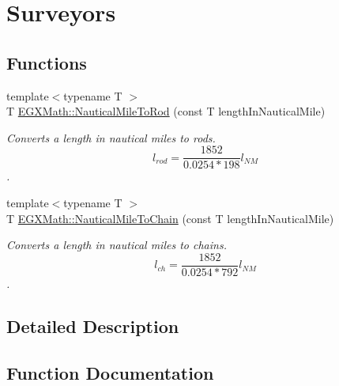 \hypertarget{group___e_g_x_math-_conversions-_length_conversions-_non-_s_i-_nautical_mile-_surveyors}{}\section{Surveyors}
\label{group___e_g_x_math-_conversions-_length_conversions-_non-_s_i-_nautical_mile-_surveyors}
\subsection*{Functions}
\begin{DoxyCompactItemize}
\item 
{\footnotesize template$<$typename T $>$ }\\T \mbox{\hyperlink{group___e_g_x_math-_conversions-_length_conversions-_non-_s_i-_nautical_mile-_surveyors_gafcc747668b6e7d9a786bd74dc9c95c50}{E\+G\+X\+Math\+::\+Nautical\+Mile\+To\+Rod}} (const T length\+In\+Nautical\+Mile)
\begin{DoxyCompactList}\small\item\em Converts a length in nautical miles to rods. \[ l_{rod}= \frac{1852}{0.0254 * 198} l_{NM} \]. \end{DoxyCompactList}\item 
{\footnotesize template$<$typename T $>$ }\\T \mbox{\hyperlink{group___e_g_x_math-_conversions-_length_conversions-_non-_s_i-_nautical_mile-_surveyors_ga22c96aeb0650b63698c2513a60f81456}{E\+G\+X\+Math\+::\+Nautical\+Mile\+To\+Chain}} (const T length\+In\+Nautical\+Mile)
\begin{DoxyCompactList}\small\item\em Converts a length in nautical miles to chains. \[ l_{ch}= \frac{1852}{0.0254 * 792} l_{NM} \]. \end{DoxyCompactList}\end{DoxyCompactItemize}


\subsection{Detailed Description}


\subsection{Function Documentation}
\mbox{\label{group___e_g_x_math-_conversions-_length_conversions-_non-_s_i-_nautical_mile-_surveyors_ga22c96aeb0650b63698c2513a60f81456}} 
